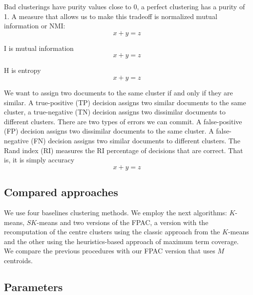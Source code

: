 \documentclass[runningheads]{llncs}
\begin{document}
Bad clusterings
have purity values close to 0, a perfect clustering has a purity of 1.
A measure that allows us to make this tradeoff is normalized mutual information or NMI:
\begin{equation}
x + y = z
\end{equation}

I is mutual information
\begin{equation}
x + y = z
\end{equation}

H is entropy
\begin{equation}
x + y = z
\end{equation}

We want to assign two documents to the same
cluster if and only if they are similar. A true-positive (TP) decision assigns
two similar documents to the same cluster, a true-negative (TN) decision assigns
two dissimilar documents to different clusters. There are two types of
errors we can commit. A false-positive (FP) decision assigns two dissimilar
documents to the same cluster. A false-negative (FN) decision assigns two
similar documents to different clusters. The Rand index (RI) measures the RI
percentage of decisions that are correct. That is, it is simply accuracy
\begin{equation}
x + y = z
\end{equation}


\subsection{Compared approaches}


We use four baselines clustering methods. We employ the next algorithms: 
$K$-means, $SK$-means and two versions of the FPAC, a version with
the recomputation of the centre clusters using the classic approach from
the $K$-means and the other using the heuristics-based approach of maximum
term coverage. We compare the previous procedures with our FPAC version
that uses $M$ centroids.

\subsection{Parameters}



%
\end{document}
